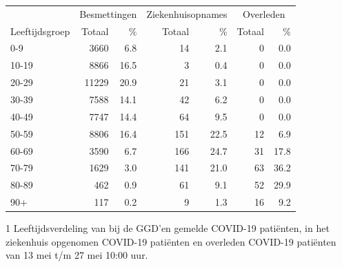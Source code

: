 \documentclass[
  english,
  man,floatsintext]{apa6}
\begin{document}
\begin{table}
\centering\begingroup\fontsize{11}{13}\selectfont

\begin{threeparttable}
\begin{tabular}{lrrrrrr}
\toprule
\multicolumn{1}{c}{ } & \multicolumn{2}{c}{Besmettingen} & \multicolumn{2}{c}{Ziekenhuisopnames} & \multicolumn{2}{c}{Overleden} \\
\cmidrule(l{3pt}r{3pt}){2-3} \cmidrule(l{3pt}r{3pt}){4-5} \cmidrule(l{3pt}r{3pt}){6-7}
Leeftijdsgroep & Totaal & \% & Totaal & \% & Totaal & \%\\
\midrule
0-9 & 3660 & 6.8 & 14 & 2.1 & 0 & 0.0\\
10-19 & 8866 & 16.5 & 3 & 0.4 & 0 & 0.0\\
20-29 & 11229 & 20.9 & 21 & 3.1 & 0 & 0.0\\
30-39 & 7588 & 14.1 & 42 & 6.2 & 0 & 0.0\\
40-49 & 7747 & 14.4 & 64 & 9.5 & 0 & 0.0\\
50-59 & 8806 & 16.4 & 151 & 22.5 & 12 & 6.9\\
60-69 & 3590 & 6.7 & 166 & 24.7 & 31 & 17.8\\
70-79 & 1629 & 3.0 & 141 & 21.0 & 63 & 36.2\\
80-89 & 462 & 0.9 & 61 & 9.1 & 52 & 29.9\\
90+ & 117 & 0.2 & 9 & 1.3 & 16 & 9.2\\
\bottomrule
\end{tabular}
\begin{tablenotes}
\item[1] Leeftijdsverdeling van bij de GGD’en gemelde COVID-19 patiënten, in het ziekenhuis opgenomen COVID-19 patiënten en overleden COVID-19 patiënten van 13 mei t/m 27 mei 10:00 uur.
\end{tablenotes}
\end{threeparttable}
\endgroup{}
\end{table}

\newpage
\end{document}
